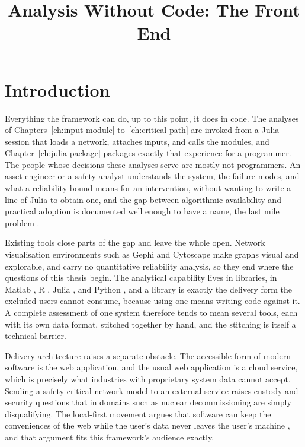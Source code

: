 \documentclass[12pt]{report}
\begin{document}
\title{Analysis Without Code: The Front End}
\fi

\newcommand{\screenshotplaceholder}[2]{%
  \fbox{\parbox[c][#1][c]{0.94\linewidth}{\centering\itshape final interface capture:\\ #2}}}



\section{Introduction}
\label{sec:fe-intro}

Everything the framework can do, up to this point, it does in code. The analyses of Chapters~\ref{ch:input-module} to~\ref{ch:critical-path} are invoked from a Julia session that loads a network, attaches inputs, and calls the modules, and Chapter~\ref{ch:julia-package} packages exactly that experience for a programmer. The people whose decisions these analyses serve are mostly not programmers. An asset engineer or a safety analyst understands the system, the failure modes, and what a reliability bound means for an intervention, without wanting to write a line of Julia to obtain one, and the gap between algorithmic availability and practical adoption is documented well enough to have a name, the last mile problem \cite{hannay2009scientists,prabhu2011survey}.

Existing tools close parts of the gap and leave the whole open. Network visualisation environments such as Gephi \cite{bastian2009gephi} and Cytoscape \cite{shannon2003cytoscape} make graphs visual and explorable, and carry no quantitative reliability analysis, so they end where the questions of this thesis begin. The analytical capability lives in libraries, in Matlab \cite{opencossan2018}, R \cite{ferson2019pbar}, Julia \cite{gray2021pbajulia}, and Python \cite{gray2022pba}, and a library is exactly the delivery form the excluded users cannot consume, because using one means writing code against it. A complete assessment of one system therefore tends to mean several tools, each with its own data format, stitched together by hand, and the stitching is itself a technical barrier.

Delivery architecture raises a separate obstacle. The accessible form of modern software is the web application, and the usual web application is a cloud service, which is precisely what industries with proprietary system data cannot accept. Sending a safety-critical network model to an external service raises custody and security questions \cite{hashizume2013analysis} that in domains such as nuclear decommissioning are simply disqualifying. The local-first movement argues that software can keep the conveniences of the web while the user's data never leaves the user's machine \cite{kleppmann2019local}, and that argument fits this framework's audience exactly.
\end{document}
